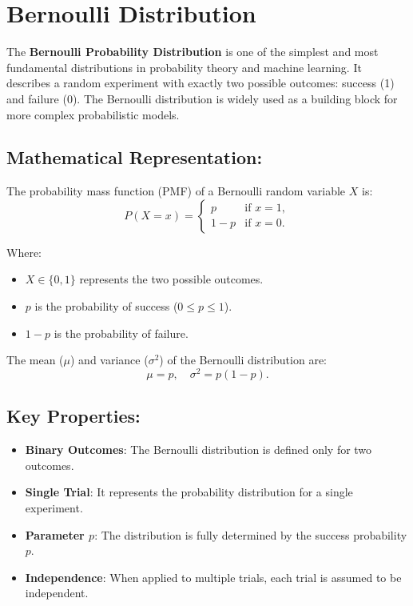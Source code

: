 \section{Bernoulli Distribution}
The \textbf{Bernoulli Probability Distribution} is one of the simplest and most fundamental distributions in probability theory and machine learning. It describes a random experiment with exactly two possible outcomes: success (1) and failure (0). The Bernoulli distribution is widely used as a building block for more complex probabilistic models.

\subsection*{Mathematical Representation:}
The probability mass function (PMF) of a Bernoulli random variable $X$ is:
\[
    P(X = x) =
    \begin{cases}
    p & \text{if } x = 1, \\
    1 - p & \text{if } x = 0.
    \end{cases}
\]

Where:
\begin{itemize}
    \item $X \in \{0, 1\}$ represents the two possible outcomes.
    \item $p$ is the probability of success ($0 \leq p \leq 1$).
    \item $1 - p$ is the probability of failure.
\end{itemize}

The mean ($\mu$) and variance ($\sigma^2$) of the Bernoulli distribution are:
\[
    \mu = p, \quad \sigma^2 = p(1 - p).
\]

\subsection*{Key Properties:}
\begin{itemize}
    \item \textbf{Binary Outcomes}: The Bernoulli distribution is defined only for two outcomes.
    \item \textbf{Single Trial}: It represents the probability distribution for a single experiment.
    \item \textbf{Parameter $p$}: The distribution is fully determined by the success probability $p$.
    \item \textbf{Independence}: When applied to multiple trials, each trial is assumed to be independent.
\end{itemize}

